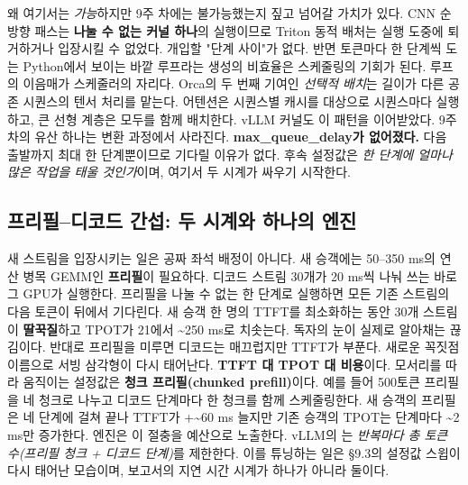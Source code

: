 왜 여기서는 \textit{가능}하지만 9주 차에는 불가능했는지 짚고 넘어갈 가치가 있다. CNN 순방향 패스는 \textbf{나눌 수 없는 커널 하나}의 실행이므로 Triton 동적 배처는 실행 도중에 퇴거하거나 입장시킬 수 없었다. 개입할 "단계 사이"가 없다. 반면 토큰마다 한 단계씩 도는 Python에서 보이는 바깥 루프라는 생성의 비효율은 스케줄링의 기회가 된다. 루프의 이음매가 스케줄러의 자리다. Orca의 두 번째 기여인 \textit{선택적 배치}는 길이가 다른 공존 시퀀스의 텐서 처리를 맡는다. 어텐션은 시퀀스별 캐시를 대상으로 시퀀스마다 실행하고, 큰 선형 계층은 모두를 함께 배치한다. vLLM 커널도 이 패턴을 이어받았다. 9주 차의 유산 하나는 변환 과정에서 사라진다. \textbf{max\_queue\_delay가 없어졌다.} 다음 출발까지 최대 한 단계뿐이므로 기다릴 이유가 없다. 후속 설정값은 \textit{한 단계에 얼마나 많은 작업을 태울 것인가}이며, 여기서 두 시계가 싸우기 시작한다.

\subsection*{프리필–디코드 간섭: 두 시계와 하나의 엔진}

새 스트림을 입장시키는 일은 공짜 좌석 배정이 아니다. 새 승객에는 50–350 ms의 연산 병목 GEMM인 \textbf{프리필}이 필요하다. 디코드 스트림 30개가 20 ms씩 나눠 쓰는 바로 그 GPU가 실행한다. 프리필을 나눌 수 없는 한 단계로 실행하면 모든 기존 스트림의 다음 토큰이 뒤에서 기다린다. 새 승객 한 명의 TTFT를 최소화하는 동안 30개 스트림이 \textbf{딸꾹질}하고 TPOT가 21에서 \textasciitilde{}250 ms로 치솟는다. 독자의 눈이 실제로 알아채는 끊김이다. 반대로 프리필을 미루면 디코드는 매끄럽지만 TTFT가 부푼다. 새로운 꼭짓점 이름으로 서빙 삼각형이 다시 태어난다. \textbf{TTFT 대 TPOT 대 비용}이다. 모서리를 따라 움직이는 설정값은 \textbf{청크 프리필(chunked prefill)}이다. 예를 들어 500토큰 프리필을 네 청크로 나누고 디코드 단계마다 한 청크를 함께 스케줄링한다. 새 승객의 프리필은 네 단계에 걸쳐 끝나 TTFT가 +\textasciitilde{}60 ms 늘지만 기존 승객의 TPOT는 단계마다 \textasciitilde{}2 ms만 증가한다. 엔진은 이 절충을 예산으로 노출한다. vLLM의 는 \textit{반복마다 총 토큰 수(프리필 청크 + 디코드 단계)}를 제한한다. 이를 튜닝하는 일은 §9.3의 설정값 스윕이 다시 태어난 모습이며, 보고서의 지연 시간 시계가 하나가 아니라 둘이다.

